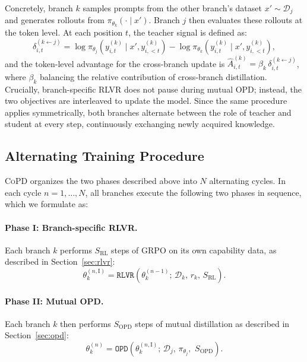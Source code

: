 \documentclass{llmxive}
\providecommand{\method}{\textsc{CoPD}\xspace}
\begin{document}
Concretely, branch $k$ samples prompts from the other branch's dataset $x' \sim \mathcal{D}_j$ and generates rollouts from $\pi_{\theta_k}(\cdot \mid x')$. Branch $j$ then evaluates these rollouts at the token level. At each position $t$, the teacher signal is defined as:
\begin{equation}
\label{eq:delta}
\delta_{i,t}^{(k \leftarrow j)}
=
\log \pi_{\theta_j}(y_{i,t}^{(k)} \mid x', y_{i,<t}^{(k)})
-
\log \pi_{\theta_k}(y_{i,t}^{(k)} \mid x', y_{i,<t}^{(k)}),
\end{equation}
and the token-level advantage for the cross-branch update is $\hat{A}_{i,t}^{(k)} = \beta_k \, \delta_{i,t}^{(k \leftarrow j)}$, where $\beta_k$ balancing the relative contribution of cross-branch distillation. 
Crucially, branch-specific RLVR does not pause during mutual OPD; instead, the two objectives are interleaved to update the model. 
Since the same procedure applies symmetrically, both branches alternate between the role of teacher and student at every step, continuously exchanging newly acquired knowledge.

\subsection{Alternating Training Procedure}

\method organizes the two phases described above into $N$ alternating cycles. In each cycle $n = 1, \ldots, N$, all branches execute the following two phases in sequence, which we formulate as:

\paragraph{Phase I: Branch-specific RLVR.}
Each branch $k$ performs $S_{\mathrm{RL}}$ steps of GRPO on its own capability data, as described in Section~\ref{sec:rlvr}:
\begin{equation}
\theta_k^{(n,\mathrm{I})}
=
\texttt{RLVR}\!\left(\theta_k^{(n-1)};\, \mathcal{D}_k,\, r_k,\, S_{\mathrm{RL}}\right).
\end{equation}

\paragraph{Phase II: Mutual OPD.}
Each branch $k$ then performs $S_{\mathrm{OPD}}$ steps of mutual distillation as described in Section~\ref{sec:opd}:
\begin{equation}
\theta_k^{(n)}
=
\texttt{OPD}\!\left(\theta_k^{(n,\mathrm{I})};\, \mathcal{D}_j,\, \pi_{\theta_j},\, \, S_{\mathrm{OPD}}\right).
\end{equation}
\end{document}
